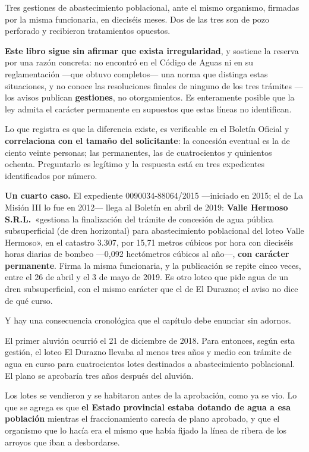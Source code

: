\begin{cautela}
Tres gestiones de abastecimiento poblacional, ante el mismo organismo, firmadas por la misma funcionaria, en dieciséis meses. Dos de las tres son de pozo perforado y recibieron tratamientos opuestos.

\textbf{Este libro sigue sin afirmar que exista irregularidad}, y sostiene la reserva por una razón concreta: no encontró en el Código de Aguas ni en su reglamentación ---que obtuvo completos--- una norma que distinga estas situaciones, y no conoce las resoluciones finales de ninguno de los tres trámites --- los avisos publican \textbf{gestiones}, no otorgamientos. Es enteramente posible que la ley admita el carácter permanente en supuestos que estas líneas no identifican.

Lo que registra es que la diferencia existe, es verificable en el Boletín Oficial y \textbf{correlaciona con el tamaño del solicitante}: la concesión eventual es la de ciento veinte personas; las permanentes, las de cuatrocientos y quinientos ochenta. Preguntarlo es legítimo y la respuesta está en tres expedientes identificados por número.
\end{cautela}

\textbf{Un cuarto caso.} El expediente 0090034-88064/2015 ---iniciado en 2015; el de La Misión III lo fue en 2012--- llega al Boletín en abril de 2019: \textbf{Valle Hermoso S.R.L.}\ «gestiona la finalización del trámite de concesión de agua pública subsuperficial (de dren horizontal) para abastecimiento poblacional del loteo Valle Hermoso», en el catastro 3.307, por 15,71 metros cúbicos por hora con dieciséis horas diarias de bombeo ---0,092 hectómetros cúbicos al año---, \textbf{con carácter permanente}. Firma la misma funcionaria, y la publicación se repite cinco veces, entre el 26 de abril y el 3 de mayo de 2019. Es otro loteo que pide agua de un dren subsuperficial, con el mismo carácter que el de El Durazno; el aviso no dice de qué curso.

Y hay una consecuencia cronológica que el capítulo debe enunciar sin adornos.

El primer aluvión ocurrió el 21 de diciembre de 2018. Para entonces, según esta gestión, el loteo El Durazno llevaba al menos tres años y medio con trámite de agua en curso para cuatrocientos lotes destinados a abastecimiento poblacional. El plano se aprobaría tres años después del aluvión.

Los lotes se vendieron y se habitaron antes de la aprobación, como ya se vio. Lo que se agrega es que \textbf{el Estado provincial estaba dotando de agua a esa población} mientras el fraccionamiento carecía de plano aprobado, y que el organismo que lo hacía era el mismo que había fijado la línea de ribera de los arroyos que iban a desbordarse.

